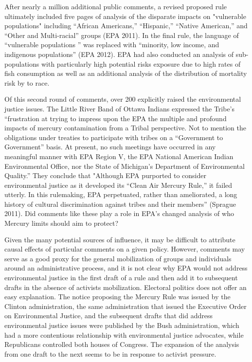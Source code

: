 After nearly a million additional public comments, a revised proposed rule ultimately included five pages of analysis of the disparate impacts on "vulnerable populations" including ``African Americans,'' ``Hispanic,'' ``Native American,'' and ``Other and Multi-racial'' groups (EPA 2011). In the final rule, the language of ``vulnerable populations '' was replaced with ``minority, low income, and indigenous populations'' (EPA 2012). EPA had also conducted an analysis of sub-populations with particularly high potential risks exposure due to high rates of fish consumption as well as an additional analysis of the distribution of mortality risk by to race.

Of this second round of comments, over 200 explicitly raised the environmental justice issues. The Little River Band of Ottawa Indians expressed the Tribe's ``frustration at trying to impress upon the EPA the multiple and profound impacts of mercury contamination from a Tribal perspective. Not to mention the obligations under treaties to participate with tribes on a “Government to Government” basis. At present, no such meetings have occurred in any meaningful manner with EPA Region V, the EPA National American Indian Environmental Office, nor the State of Michigan’s Department of Environmental Quality.'' They conclude that "Although EPA purported to consider environmental justice as it developed its “Clean Air Mercury Rule,” it failed utterly. In this rulemaking, EPA perpetuated, rather than ameliorated, a long history of cultural discrimination against tribes and their members'' (Sprague 2011). Did comments like these play a role in EPA's changed analysis of who Mercury limits should aim to protect?

Given the many potential sources of influence, it may be difficult to attribute causal effects of particular comments on a given policy. However, comments may serve as a good proxy for the general mobilization of groups and individuals around an administrative process, and it is not clear why EPA would not address environmental justice in the first draft of a rule and then add it to subsequent drafts in the absence of activists mobilization. Electoral politics does not offer an easy explanation. The notice proposing the Mercury Rule was issued by the Clinton administration, the same administration that issued the Executive Order on Environmental Justice, and the subsequent drafts that did address environmental justice issues were published by the Bush administration, which had a more contentious relationship with environmental justice advocates, while Republicans controlled both houses of Congress. The expansion of the analysis from one draft to the next seems to be in response to activist pressure. 

